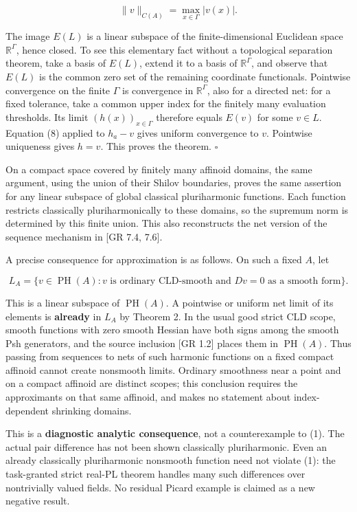 \documentclass[
  11pt,
]{article}
\begin{document}
\[\|v\|_{C(A)}=\max_{x\in\Gamma}|v(x)|. \tag{8}\]

The image \(E(L)\) is a linear subspace of the finite-dimensional
Euclidean space \(\mathbb R^\Gamma\), hence closed. To see this
elementary fact without a topological separation theorem, take a basis
of \(E(L)\), extend it to a basis of \(\mathbb R^\Gamma\), and observe
that \(E(L)\) is the common zero set of the remaining coordinate
functionals. Pointwise convergence on the finite \(\Gamma\) is
convergence in \(\mathbb R^\Gamma\), also for a directed net: for a
fixed tolerance, take a common upper index for the finitely many
evaluation thresholds. Its limit \((h(x))_{x\in\Gamma}\) therefore
equals \(E(v)\) for some \(v\in L\). Equation (8) applied to \(h_a-v\)
gives uniform convergence to \(v\). Pointwise uniqueness gives \(h=v\).
This proves the theorem. \(\square\)

On a compact space covered by finitely many affinoid domains, the same
argument, using the union of their Shilov boundaries, proves the same
assertion for any linear subspace of global classical pluriharmonic
functions. Each function restricts classically pluriharmonically to
these domains, so the supremum norm is determined by this finite union.
This also reconstructs the net version of the sequence mechanism in
{[}GR 7.4, 7.6{]}.

A precise consequence for approximation is as follows. On such a fixed
\(A\), let

\[L_A=\{v\in\operatorname{PH}(A):v\text{ is ordinary CLD-smooth and }Dv=0\text{ as a smooth form}\}.\]

This is a linear subspace of \(\operatorname{PH}(A)\). A pointwise or
uniform net limit of its elements is \textbf{already} in \(L_A\) by
Theorem 2. In the usual good strict CLD scope, smooth functions with
zero smooth Hessian have both signs among the smooth Psh generators, and
the source inclusion {[}GR 1.2{]} places them in
\(\operatorname{PH}(A)\). Thus passing from sequences to nets of such
harmonic functions on a fixed compact affinoid cannot create nonsmooth
limits. Ordinary smoothness near a point and on a compact affinoid are
distinct scopes; this conclusion requires the approximants on that same
affinoid, and makes no statement about index-dependent shrinking
domains.

This is a \textbf{diagnostic analytic consequence}, not a counterexample
to (1). The actual pair difference has not been shown classically
pluriharmonic. Even an already classically pluriharmonic nonsmooth
function need not violate (1): the task-granted strict real-PL theorem
handles many such differences over nontrivially valued fields. No
residual Picard example is claimed as a new negative result.
\end{document}
